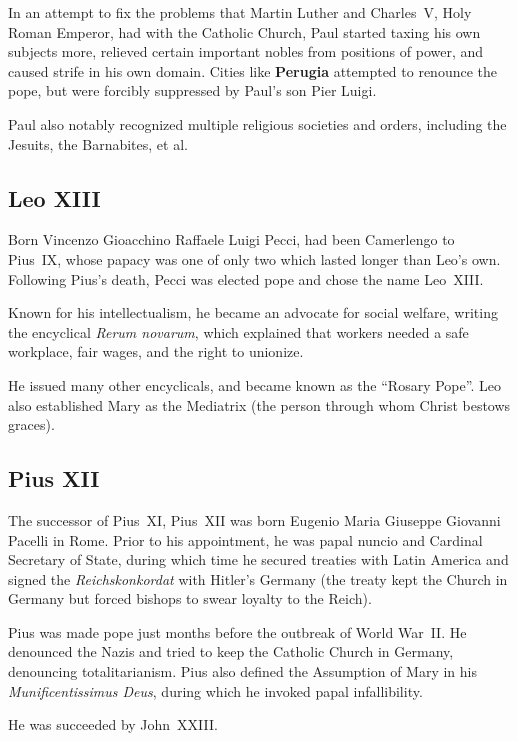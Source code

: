 In an attempt to fix the problems that Martin Luther and Charles~V, Holy Roman Emperor,
had with the Catholic Church, Paul started taxing his own subjects more,
relieved certain important nobles from positions of power, and caused strife in his own domain.
Cities like \textbf{Perugia} attempted to renounce the pope, but were forcibly suppressed by Paul's son Pier Luigi.

Paul also notably recognized multiple religious societies and orders,
including the Jesuits, the Barnabites, et al.

\subsection*{Leo XIII}

Born Vincenzo Gioacchino Raffaele Luigi Pecci,
had been Camerlengo to Pius~IX, whose papacy was one of only two which lasted longer than Leo's own.
Following Pius's death, Pecci was elected pope and chose the name Leo~XIII.

Known for his intellectualism, he became an advocate for social welfare,
writing the encyclical \textit{Rerum novarum},
which explained that workers needed a safe workplace, fair wages, and the right to unionize.

He issued many other encyclicals, and became known as the ``Rosary Pope''.
Leo also established Mary as the Mediatrix (the person through whom Christ bestows graces).

\subsection*{Pius XII}

The successor of Pius~XI,
Pius~XII was born Eugenio Maria Giuseppe Giovanni Pacelli in Rome.
Prior to his appointment, he was papal nuncio and Cardinal Secretary of State,
during which time he secured treaties with Latin America
and signed the \textit{Reichskonkordat} with Hitler's Germany
(the treaty kept the Church in Germany but forced bishops to swear loyalty to the Reich).

Pius was made pope just months before the outbreak of World War~II\@.
He denounced the Nazis and tried to keep the Catholic Church in Germany,
denouncing totalitarianism.
Pius also defined the Assumption of Mary in his \textit{Munificentissimus Deus},
during which he invoked papal infallibility.

He was succeeded by John~XXIII\@.
